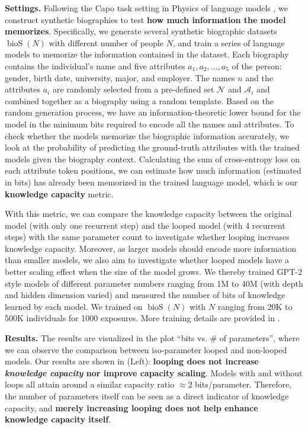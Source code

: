 \documentclass[]{bytedance_seed}
\newcommand{\1}{\mathbf{1}}
\begin{document}
\textbf{Settings.} Following the Capo task setting in Physics of language models \cite{AL2024-knowledge3,Allenzhu2025-canon}, we construct synthetic biographies to test \textbf{how much information the model memorizes}. 
Specifically, we generate several synthetic biographic datasets $\operatorname{bioS}(N)$ with different number of people $N$, and train a series of language models to memorize the information contained in the dataset. Each biography contains the individual's name and five attributes $a_1,a_2,...,a_5$ of the person: gender, birth date, university, major, and employer. The names $n$ and the attributes $a_i$ are randomly selected from a pre-defined set $\mathcal{N}$ and $\mathcal{A}_i$ and combined together as a biography using a random template. Based on the random generation process, we have an information-theoretic lower bound for the model in the minimum bits required to encode all the names and attributes. To check whether the models memorize the biographic information accurately, we look at the probability of predicting the ground-truth attributes with the trained models given the biography context.  
Calculating the sum of cross-entropy loss on each attribute token positions, we can estimate how much information (estimated in bits) has already been memorized in the trained language model, which is our \textbf{knowledge capacity} metric. 

With this metric, we can compare the knowledge capacity between the original model (with only one recurrent step) and the looped model (with 4 recurrent steps) with the same parameter count to investigate whether looping increases knowledge capacity. Moreover, as larger models should encode more information than smaller models, we also aim to investigate whether looped models have a better scaling effect when the size of the model grows. 
We thereby trained GPT-2 style models of different parameter numbers ranging from 1M to 40M (with depth and hidden dimension varied) and measured the number of bits of knowledge learned by each model. We trained on $\operatorname{bioS}(N)$ with $N$ ranging from 20K to 500K individuals for 1000 exposures. More training details are provided in .

\textbf{Results.} The results are visualized in the plot ``bits vs. \# of parameters'', where we can observe the comparison between iso-parameter looped and non-looped models. Our results are shown in  (Left): \textbf{looping does not increase \textit{knowledge capacity} nor improve capacity scaling}. Models with and without loops all attain around a similar capacity ratio $\approx 2$ bits/parameter. Therefore, the number of parameters itself can be seen as a direct indicator of knowledge capacity, and \textbf{merely increasing looping does not help enhance knowledge capacity itself}.
\end{document}
